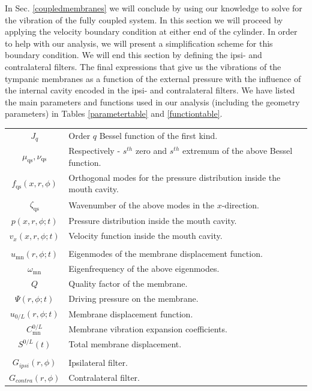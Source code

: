 In Sec. \ref{coupledmembranes} we will conclude by using our knowledge to solve for the vibration of the fully coupled
system. In this section we will  proceed by applying the velocity boundary condition at either end of the cylinder. In
order to help with our analysis, we will present a simplification scheme for this boundary condition. We will end this section
by defining the ipsi- and contralateral filters. The final expressions that give us the vibrations 
of the tympanic membranes as a function of the external pressure with the influence of the internal cavity encoded in the ipsi- and contralateral filters. 
We have listed the main parameters and functions used in our analysis (including the geometry parameters) in Tables \ref{parametertable}
and \ref{functiontable}.
\begin{minipage}{\linewidth}
\renewcommand{\arraystretch}{1.1}
\centering
{} \label{functiontable} 
\begin{tabular}{c p{13 cm}}
\hline
$J_q$ & Order $q$ Bessel function of the first kind.\\
$\mu_{\mathrm{qs}},\nu_{\mathrm{qs}}$ & Respectively - $s^{th}$ zero and $s^{th}$ extremum of the above Bessel function.\\
$f_{\mathrm{qs}}(x,r,\phi)$ & Orthogonal modes for the pressure distribution inside the mouth cavity.\\
$\zeta_{\mathrm{qs}}$ & Wavenumber of the above modes in the $x$-direction.\\
$p(x,r,\phi;t)$ & Pressure distribution inside the mouth cavity.\\
$v_x(x,r,\phi;t)$ & Velocity function inside the mouth cavity.\\
&\\
$u_{\mathrm{mn}}(r,\phi;t)$ & Eigenmodes of the membrane displacement function.\\
$\omega_{\mathrm{mn}}$ & Eigenfrequency of the above eigenmodes.\\
$Q$ & Quality factor of the membrane.\\
$\Psi(r,\phi;t)$ & Driving pressure on the membrane.\\
$u_{0/L}(r,\phi;t)$ & Membrane displacement function.\\
$C^{0/L}_{\mathrm{mn}}$ & Membrane vibration expansion coefficients.\\
$S^{0/L}(t)$ & Total membrane displacement.\\
&\\
$G_{ipsi}(r,\phi)$ & Ipsilateral filter.\\
$G_{contra}(r,\phi)$ & Contralateral filter.\\
\hline
\end {tabular}\par
\bigskip
\end{minipage}
